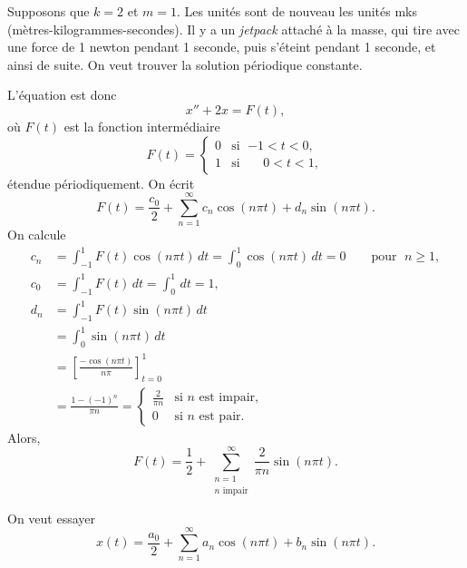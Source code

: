 \begin{example} \label{afs:steadyex}
Supposons que $k=2$ et $m=1$.
Les unités sont de nouveau les unités mks (mètres-kilogrammes-secondes).
Il y a un \emph{jetpack} attaché à la masse, qui tire avec une force de 1
newton pendant 1 seconde, puis s'éteint pendant 1 seconde, et ainsi de suite. On veut trouver la solution périodique constante.

L'équation est donc
\begin{equation*}
x'' + 2 x = F(t) ,
\end{equation*}
où $F(t)$ est la fonction intermédiaire
\begin{equation*}
F(t) =
\begin{cases}
0 & \text{si } \; {-1} < t < 0 , \\
1 & \text{si } \; \phantom{-}0 < t < 1 ,
\end{cases}
\end{equation*}
étendue périodiquement.
On écrit
\begin{equation*}
F(t) = \frac{c_0}{2} + \sum_{n=1}^\infty
c_n \cos (n \pi t) +
d_n \sin (n \pi t) .
\end{equation*}
On calcule
\begin{align*}
c_n & = \int_{-1}^1 F(t) \cos (n \pi t) \, dt = 
\int_{0}^1 \cos (n \pi t) \, dt = 0 \qquad \text{pour } \; n \geq 1,
\\
c_0 & = \int_{-1}^1 F(t) \, dt = 
\int_{0}^1 \, dt = 1 ,
\\
d_n & = \int_{-1}^1 F(t) \sin (n \pi t) \, dt
\\
& = \int_{0}^1 \sin (n \pi t) \, dt
\\
& = \left[ \frac{-\cos (n \pi t)}{n \pi} \right]_{t=0}^1
\\
& = \frac{1-{(-1)}^n}{\pi n} =
\begin{cases}
\frac{2}{\pi n} & \text{si } n \text{ est impair} , \\
0 & \text{si } n \text{ est pair} .
\end{cases}
\end{align*}
Alors,
\begin{equation*}
F(t) = \frac{1}{2} + \sum_{\substack{n=1 \\ n \text{ impair}}}^\infty
\frac{2}{\pi n} \sin (n \pi t) .
\end{equation*}

On veut essayer
\begin{equation*}
x(t) = \frac{a_0}{2} + \sum_{n=1}^\infty
a_n \cos (n \pi t) +
b_n \sin (n \pi t) .
\end{equation*}


\end{example}
